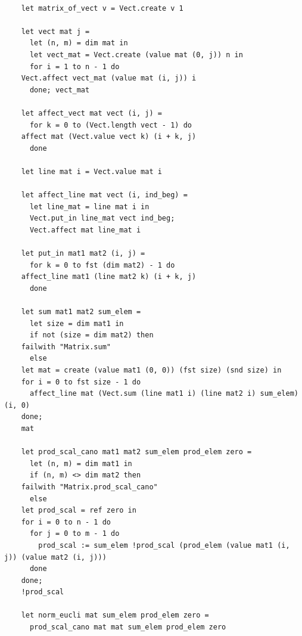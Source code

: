 \documentclass[a4paper,10pt]{report}
\theoremstyle{break}
\begin{document}
    \begin{lstlisting}

    let matrix_of_vect v = Vect.create v 1

    let vect mat j = 
      let (n, m) = dim mat in
      let vect_mat = Vect.create (value mat (0, j)) n in
      for i = 1 to n - 1 do
	Vect.affect vect_mat (value mat (i, j)) i
      done; vect_mat

    let affect_vect mat vect (i, j) =
      for k = 0 to (Vect.length vect - 1) do
	affect mat (Vect.value vect k) (i + k, j)
      done

    let line mat i = Vect.value mat i

    let affect_line mat vect (i, ind_beg) =
      let line_mat = line mat i in
      Vect.put_in line_mat vect ind_beg;
      Vect.affect mat line_mat i

    let put_in mat1 mat2 (i, j) =
      for k = 0 to fst (dim mat2) - 1 do
	affect_line mat1 (line mat2 k) (i + k, j)
      done
		
    let sum mat1 mat2 sum_elem =
      let size = dim mat1 in
      if not (size = dim mat2) then
	failwith "Matrix.sum"
      else
	let mat = create (value mat1 (0, 0)) (fst size) (snd size) in
	for i = 0 to fst size - 1 do
	  affect_line mat (Vect.sum (line mat1 i) (line mat2 i) sum_elem) (i, 0)
	done; 
	mat

    let prod_scal_cano mat1 mat2 sum_elem prod_elem zero =
      let (n, m) = dim mat1 in
      if (n, m) <> dim mat2 then
	failwith "Matrix.prod_scal_cano"
      else
	let prod_scal = ref zero in
	for i = 0 to n - 1 do
	  for j = 0 to m - 1 do
	    prod_scal := sum_elem !prod_scal (prod_elem (value mat1 (i, j)) (value mat2 (i, j)))
	  done
	done;
	!prod_scal				

    let norm_eucli mat sum_elem prod_elem zero =
      prod_scal_cano mat mat sum_elem prod_elem zero
	
    \end{lstlisting}
\newpage
\end{document}
